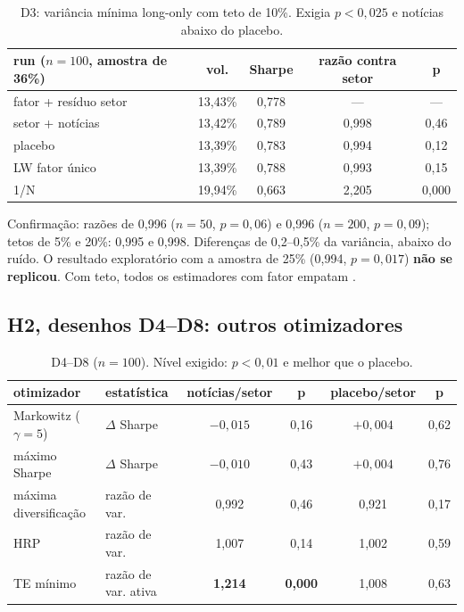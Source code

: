 \documentclass[11pt,a4paper]{article}
\begin{document}
\begin{table}[h]
\centering\small
\begin{tabular}{lcccc}
\toprule
run ($n=100$, amostra de 36\%) & vol. & Sharpe & razão contra setor & p \\
\midrule
fator + resíduo setor & 13,43\% & 0,778 & --- & --- \\
setor + notícias & 13,42\% & 0,789 & 0,998 & 0,46 \\
placebo & 13,39\% & 0,783 & 0,994 & 0,12 \\
LW fator único & 13,39\% & 0,788 & 0,993 & 0,15 \\
1/N & 19,94\% & 0,663 & 2,205 & 0,000 \\
\bottomrule
\end{tabular}
\caption{D3: variância mínima long-only com teto de 10\%. Exigia $p<0{,}025$ e notícias abaixo do placebo.}
\end{table}

Confirmação: razões de 0,996 ($n=50$, $p=0{,}06$) e 0,996 ($n=200$, $p=0{,}09$); tetos de 5\% e 20\%: 0,995 e
0,998. Diferenças de 0,2--0,5\% da variância, abaixo do ruído. O resultado exploratório com a amostra de
25\% (0,994, $p=0{,}017$) \textbf{não se replicou}. Com teto, todos os estimadores com fator empatam
\citep{jagannathan2003}.

\subsection{H2, desenhos D4--D8: outros otimizadores}

\begin{table}[h]
\centering\small
\begin{tabular}{llcccc}
\toprule
otimizador & estatística & notícias/setor & p & placebo/setor & p \\
\midrule
Markowitz ($\gamma=5$) & $\Delta$ Sharpe & $-0{,}015$ & 0,16 & $+0{,}004$ & 0,62 \\
máximo Sharpe & $\Delta$ Sharpe & $-0{,}010$ & 0,43 & $+0{,}004$ & 0,76 \\
máxima diversificação & razão de var. & 0,992 & 0,46 & 0,921 & 0,17 \\
HRP & razão de var. & 1,007 & 0,14 & 1,002 & 0,59 \\
TE mínimo & razão de var. ativa & \textbf{1,214} & \textbf{0,000} & 1,008 & 0,63 \\
\bottomrule
\end{tabular}
\caption{D4--D8 ($n=100$). Nível exigido: $p<0{,}01$ e melhor que o placebo.}
\end{table}
\end{document}
